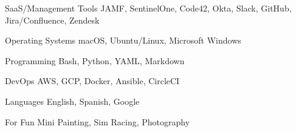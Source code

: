 

\begin{cvskills}


  \cvskill
    {SaaS/Management Tools} %
    {JAMF, SentinelOne, Code42, Okta, Slack, GitHub, Jira/Confluence, Zendesk} %

  \cvskill
    {Operating Systems} %
    {macOS, Ubuntu/Linux, Microsoft Windows} %

  \cvskill
    {Programming} %
    {Bash, Python, YAML, Markdown} %

  \cvskill
    {DevOps} %
    {AWS, GCP, Docker, Ansible, CircleCI} %

  \cvskill
    {Languages} %
    {English, Spanish, Google} %

  \cvskill
    {For Fun}
    {Mini Painting, Sim Racing, Photography}

\end{cvskills}
